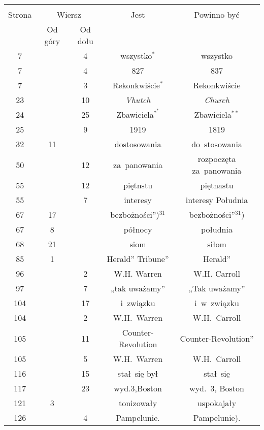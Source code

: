 \documentclass[a4paper,11pt]{article}
\begin{document}


\begin{center}

  \begin{tabular}{|c|c|c|c|c|}
    \hline
    & \multicolumn{2}{c|}{} & & \\
    Strona & \multicolumn{2}{c|}{Wiersz} & Jest
                              & Powinno być \\ \cline{2-3}
    & Od góry & Od dołu & & \\
    \hline
    7   & &  4 & wszystko$^{ * }$ & wszystko \\
    7   & &  4 & 827 & 837 \\
    7   & &  3 & Rekonkwiście$^{ * }$ & Rekonkwiście \\
    23  & & 10 & \textit{Vhutch} & \textit{Church} \\
    24  & & 25 & Zbawiciela$^{ *^{ * } }$ & Zbawiciela$^{ ** }$ \\
    25  & &  9 & 1919 & 1819 \\
    32  & 11 & & dostosowania & do~stosowania \\
    50  & & 12 & za~panowania & rozpoczęta za~panowania \\
    55  & & 12 & piętnstu & piętnastu \\
    55  & &  7 & interesy & interesy Południa \\
    67  & 17 & & bezbożności”)$^{ 31 }$ & bezbożności”$^{ 31 }$) \\
    67  &  8 & & północy & południa \\
    68  & 21 & & siom & siłom \\
    85  &  1 & & Herald” Tribune” & Herald” \\
    96  & &  2 & W.H. Warren & W.H. Carroll \\
    97  & &  7 & „tak uważamy” & „Tak uważamy” \\
    104 & & 17 & i~związku & i~w~związku \\
    104 & &  2 & W.H.~Warren & W.H.~Carroll \\
    105 & & 11 & Counter-Revolution & Counter-Revolution” \\
    105 & &  5 & W.H.~Warren & W.H.~Carroll \\
    116 & & 15 & stał~się był & stał~się \\
    117 & & 23 & wyd.3,Boston & wyd.~3, Boston \\
    121 &  3 & & tonizowały & uspokajały \\
    126 & &  4 & Pampelunie. & Pampelunie). \\

\end{tabular}
\end{center}
\end{document}
